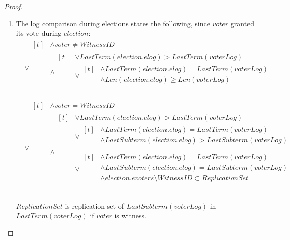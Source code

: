 \begin{proof}
\begin{enumerate}
		\item The log comparison during elections states the following, since $voter$ granted its vote during $election$:
		\begin{displaymath}
			\begin{aligned}
				&\lor 
				\!\begin{aligned}[t]
					&\land voter \ne WitnessID \\
					&\land 
					\!\begin{aligned}[t]
						&\lor LastTerm(election.elog) > LastTerm(voterLog) \\
						&\lor
						\!\begin{aligned}[t]
							&\land LastTerm(election.elog) = LastTerm(voterLog) \\
							&\land Len(election.elog) \ge Len(voterLog) \\
						\end{aligned} \\
					\end{aligned} \\
				\end{aligned} \\
				&\lor
				\!\begin{aligned}[t]
					&\land voter = WitnessID \\
					&\land 
					\!\begin{aligned}[t]
						&\lor LastTerm(election.elog) > LastTerm(voterLog) \\
						&\lor
						\!\begin{aligned}[t]
							&\land LastTerm(election.elog) = LastTerm(voterLog) \\
							&\land LastSubterm(election.elog) > LastSubterm(voterLog) \\
						\end{aligned} \\
						&\lor
						\!\begin{aligned}[t]
							&\land LastTerm(election.elog) = LastTerm(voterLog) \\
							&\land LastSubterm(election.elog) = LastSubterm(voterLog) \\
							&\land election.evoters \setminus {WitnessID} \subset ReplicationSet \\
						\end{aligned} \\
					\end{aligned} \\
				\end{aligned} \\
			\end{aligned}
		\end{displaymath}
		$ReplicationSet$ is replication set of $LastSubterm(voterLog)$ in $LastTerm(voterLog)$ if $voter$ is witness.


\end{enumerate}
\end{proof}

